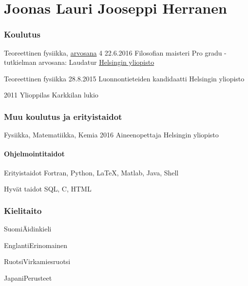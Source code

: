 \documentclass{tccv}
\begin{document}
\part{Joonas Lauri Jooseppi Herranen}

\section{Koulutus}
\begin{yearlist}
	\item[Teoreettinen fysiikka, \href{https://wiki.helsinki.fi/display/mathstatOpiskelu/Kokonaisuuksien+arvostelu}{arvosana} 4]{22.6.2016}
	{Filosofian maisteri}
	{Pro gradu -tutkielman arvosana: Laudatur
	\href{mailto:registrar@helsinki.fi}{Helsingin yliopisto}}
	
	\item[Teoreettinen fysiikka]{28.8.2015}
	{Luonnontieteiden kandidaatti}
	{Helsingin yliopisto}
	\item[] {2011}
	{Ylioppilas}
	{Karkkilan lukio}
\end{yearlist}

\section{Muu koulutus ja erityistaidot}
\begin{yearlist}
	\item[Fysiikka, Matematiikka, Kemia]{2016}
	{Aineenopettaja}
	{Helsingin yliopisto}
\end{yearlist}

\subsection{Ohjelmointitaidot}
\begin{factlist}
	\item{Erityistaidot}
	{Fortran, Python, \LaTeX, Matlab, Java, Shell}
	
	\item{Hyvät taidot}
	{SQL, C, HTML}
\end{factlist}

\section{Kielitaito}
\begin{factlist}
	\item{Suomi}{Äidinkieli}
	\item{Englanti}{Erinomainen}
	\item{Ruotsi}{Virkamiesruotsi}
	\item{Japani}{Perusteet}
\end{factlist}
\end{document}
